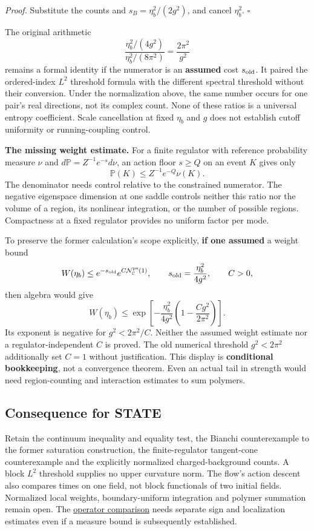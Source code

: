 \documentclass[11pt,a4paper]{article}
\begin{document}
\emph{Proof.} Substitute the counts and \(s_B=\eta_b^2/(2g^2)\), and
cancel \(\eta_b^2\). \(\square\)

The original arithmetic \[\frac{\eta_b^2/(4g^2)}{\eta_b^2/(8\pi^2)}
=\frac{2\pi^2}{g^2}\] remains a formal identity if the numerator is an
\textbf{assumed} cost \(s_{\rm old}\). It paired the ordered-index
\(L^2\) threshold formula with the different spectral threshold without
their conversion. Under the normalization above, the same number occurs
for one pair's real directions, not its complex count. None of these
ratios is a universal entropy coefficient. Scale cancellation at fixed
\(\eta_b\) and \(g\) does not establish cutoff uniformity or
running-coupling control.

\textbf{The missing weight estimate.} For a finite regulator with
reference probability measure \(\nu\) and
\(d\mathbb P=Z^{-1}e^{-s}d\nu\), an action floor \(s\ge Q\) on an event
\(K\) gives only \[\mathbb P(K)\le Z^{-1}e^{-Q}\nu(K).\] The denominator
needs control relative to the constrained numerator. The negative
eigenspace dimension at one saddle controls neither this ratio nor the
volume of a region, its nonlinear integration, or the number of possible
regions. Compactness at a fixed regulator provides no uniform factor per
mode.

To preserve the former calculation's scope explicitly, \textbf{if one
assumed} a weight bound
\[W(\eta_b)\le e^{-s_{\rm old}}e^{C\mathcal N_{\mathbb C}^{\rm ps}(1)},
\qquad s_{\rm old}=\frac{\eta_b^2}{4g^2},\qquad C>0,\] then algebra
would give \[W(\eta_b)\le
\exp\left[-\frac{\eta_b^2}{4g^2}
\left(1-\frac{Cg^2}{2\pi^2}\right)\right].\] Its exponent is negative
for \(g^2<2\pi^2/C\). Neither the assumed weight estimate nor a
regulator-independent \(C\) is proved. The old numerical threshold
\(g^2<2\pi^2\) additionally set \(C=1\) without justification. This
display is \textbf{conditional bookkeeping}, not a convergence theorem.
Even an actual tail in strength would need region-counting and
interaction estimates to sum polymers.

\hypertarget{consequence-for-state}{%
\subsection{Consequence for STATE}\label{consequence-for-state}}

Retain the continuum inequality and equality test, the Bianchi
counterexample to the former saturation construction, the
finite-regulator tangent-cone counterexample and the explicitly
normalized charged-background counts. A block \(L^2\) threshold supplies
no upper curvature norm. The flow's action descent also compares times
on one field, not block functionals of two initial fields. Normalized
local weights, boundary-uniform integration and polymer summation remain
open. The \href{large-field-operator-inequality.md}{operator comparison}
needs separate sign and localization estimates even if a measure bound
is subsequently established.
\end{document}
